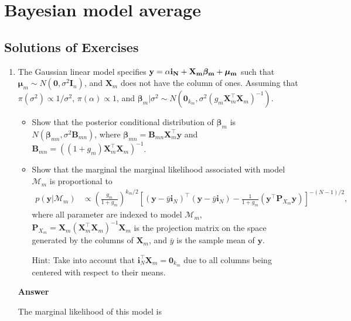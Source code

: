 \chapter{Bayesian model average}\label{chap10}

\section{Solutions of Exercises}\label{sec101}
\begin{enumerate}[leftmargin=*]

	\item The Gaussian linear model specifies $\bf{y}=\alpha\bm{i}_N+\bm{X}_m\bm{\beta}_m+\bm{\mu}_m$ such that $\bm{\mu}_m\sim{N}(\bm{0},\sigma^2\bm{I}_n)$, and $\bm{X}_m$ does not have the column of ones. Assuming that $\pi(\sigma^2)\propto 1/{\sigma^2}$, $\pi(\alpha)\propto 1$, and $\bm{\beta}_m|\sigma^2 \sim {N}(\bm{0}_{k_m}, \sigma^2 (g_m\bm{X}_m^{\top}\bm{X}_m)^{-1})$.
\begin{itemize}
	\item Show that the posterior conditional distribution of $\bm{\beta}_m$ is $N(\bm{\beta}_{mn},\sigma^2\bm{B}_{mn})$, where $\bm{\beta}_{mn}=\bm{B}_{mn}\bm{X}_m^{\top}\bm{y}$ and $\bm{B}_{mn}=((1+g_m)\bm{X}_m^{\top}\bm{X}_m)^{-1}$.
	\item Show that the marginal the marginal likelihood associated with model $\mathcal{M}_m$ is proportional to
	\begin{align*}
		p(\bm{y}|\mathcal{M}_m)&\propto \left(\frac{g_m}{1+g_m}\right)^{k_m/2} \left[(\bm{y}-\bar{y}\bm{i}_N)^{\top}(\bm{y}-\bar{y}\bm{i}_N)-\frac{1}{1+g_m}(\bm{y}^{\top}\bm{P}_{X_m}\bm{y})\right]^{-(N-1)/2},
	\end{align*}
	where all parameter are indexed to model $\mathcal{M}_m$, $\bm{P}_{X_m}=\bm{X}_m(\bm{X}_m^{\top}\bm{X}_m)^{-1}\bm{X}_m$ is the projection matrix on the space generated by the columns of $\bm{X}_m$, and $\bar{y}$ is the sample mean of $\bm{y}$.
	
	Hint: Take into account that $\bm{i}_N^{\top}\bm{X}_m=\bm{0}_{k_m}$ due to all columns being centered with respect to their means.
\end{itemize}
\textbf{Answer}

The marginal likelihood of this model is


\end{enumerate}

